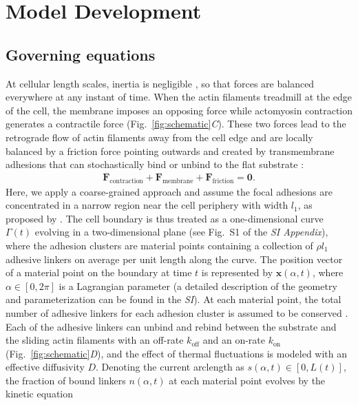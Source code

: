 \documentclass[12pt]{article}
\newcommand{\mbf}{\boldsymbol}
\begin{document}
\section*{Model Development}
\subsection*{Governing equations}
        At cellular length scales, inertia is negligible \cite{danuser2013mathematical}, so that forces are balanced everywhere at any instant of time. 
        When the actin filaments treadmill at the edge of the cell, the membrane imposes an opposing force while actomyosin contraction generates a contractile force (Fig.~\ref{fig:schematic}\textit{C}). 
        These two forces lead to the retrograde flow of actin filaments away from the cell edge and are locally balanced by a friction force pointing outwards and created by transmembrane adhesions that can stochastically bind or unbind to the flat substrate \cite{schwarz2013physics}: 
            \begin{align}
                \mbf{F}_{\text{contraction}} + \mbf{F}_{\text{membrane}} + \mbf{F}_{\text{friction}} = \mbf{0}.
            \end{align}
        Here, we apply a coarse-grained approach and assume the focal adhesions are concentrated in a narrow region near the cell periphery with width $l_1$, as proposed by \cite{sens2020stick}. 
        The cell boundary is thus treated as a one-dimensional curve $\Gamma(t)$ evolving in a two-dimensional plane (see Fig.~S1 of the \textit{SI Appendix}), where the adhesion clusters are material points containing a collection of $\rho l_1$ adhesive linkers on average per unit length along the curve. 
        The position vector of a material point on the boundary at time $t$ is represented by $\mbf{x}(\alpha,t)$, where $\alpha\in[0,2\pi]$ is a Lagrangian parameter (a detailed description of the geometry and parameterization can be found in the \textit{SI}). 
        At each material point, the total number of adhesive linkers for each adhesion cluster is assumed to be conserved \cite{schwarz2013physics}. 
        Each of the adhesive linkers can unbind and rebind between the substrate and the sliding actin filaments with an off-rate $k_{\text{off}}$ and an on-rate $k_{\text{on}}$ (Fig.~\ref{fig:schematic}\textit{D}), and the effect of thermal fluctuations is modeled with an effective diffusivity $D$. 
        Denoting the current arclength as $s(\alpha,t)\in[0,L(t)]$, the fraction of bound linkers $n(\alpha,t)$ at each material point evolves by the kinetic equation
\end{document}
